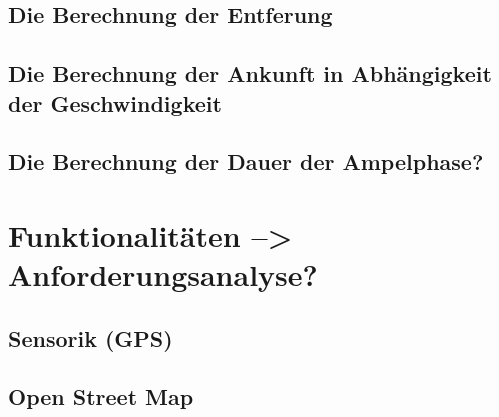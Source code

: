\subsection{Die Berechnung der Entferung}
\subsection{Die Berechnung der Ankunft in Abhängigkeit der Geschwindigkeit}
\subsection{Die Berechnung der Dauer der Ampelphase?}
\section{Funktionalitäten --> Anforderungsanalyse?}
\subsection*{Sensorik (GPS)}
\subsection*{Open Street Map}
